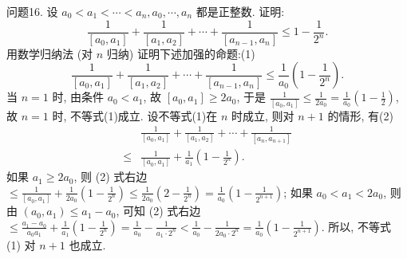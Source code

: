问题16. 设 $a_0<a_1<\cdots<a_n, a_0, \cdots, a_n$ 都是正整数.
证明:
$$
\frac{1}{\left[a_0, a_1\right]}+\frac{1}{\left[a_1, a_2\right]}+\cdots+\frac{1}{\left[a_{n-1}, a_n\right]} \leqslant 1-\frac{1}{2^n} .
$$
用数学归纳法 (对 $n$ 归纳) 证明下述加强的命题:(1)
$$
\frac{1}{\left[a_0, a_1\right]}+\frac{1}{\left[a_1, a_2\right]}+\cdots+\frac{1}{\left[a_{n-1}, a_n\right]} \leqslant \frac{1}{a_0}\left(1-\frac{1}{2^n}\right) .
$$
当 $n=1$ 时, 由条件 $a_0<a_1$, 故 $\left[a_0, a_1\right] \geqslant 2 a_0$, 于是 $\frac{1}{\left[a_0, a_1\right]} \leqslant \frac{1}{2 a_0}= \frac{1}{a_0}\left(1-\frac{1}{2}\right)$, 故 $n=1$ 时, 不等式(1)成立.
设不等式(1)在 $n$ 时成立, 则对 $n+1$ 的情形, 有(2)
$$
\begin{aligned}
& \frac{1}{\left[a_0, a_1\right]}+\frac{1}{\left[a_1, a_2\right]}+\cdots+\frac{1}{\left[a_n, a_{n+1}\right]} \\
\leqslant & \frac{1}{\left[a_0, a_1\right]}+\frac{1}{a_1}\left(1-\frac{1}{2^n}\right) .
\end{aligned}
$$
如果 $a_1 \geqslant 2 a_0$, 则 (2) 式右边 $\leqslant \frac{1}{\left[a_0, a_1\right]}+\frac{1}{2 a_0}\left(1-\frac{1}{2^n}\right) \leqslant \frac{1}{2 a_0}\left(2-\frac{1}{2^n}\right)= \frac{1}{a_0}\left(1-\frac{1}{2^{n+1}}\right)$; 如果 $a_0<a_1<2 a_0$, 则由 $\left(a_0, a_1\right) \leqslant a_1-a_0$, 可知 (2) 式右边 $\leqslant\frac{a_1-a_0}{a_0 a_1}+\frac{1}{a_1}\left(1-\frac{1}{2^n}\right)=\frac{1}{a_0}-\frac{1}{a_1 \cdot 2^n}<\frac{1}{a_0}-\frac{1}{2 a_0 \cdot 2^n}=\frac{1}{a_0}\left(1-\frac{1}{2^{n+1}}\right)$. 所以, 不等式 (1) 对 $n+1$ 也成立.



